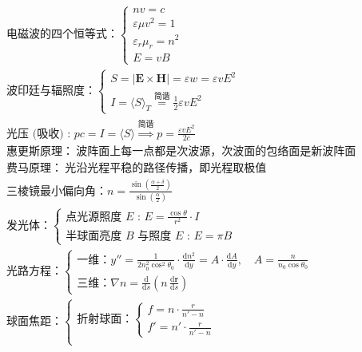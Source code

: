\documentclass[UTF8]{report}
\theoremstyle{MyLineTheoremStyle} %
\theoremstyle{MyBlockTheoremStyle} %
\theoremstyle{MySubsubsectionStyle} %
\begin{document}
\begin{align}
&
\text{电磁波的四个恒等式：} \begin{cases}
    nv = c \\ 
    \varepsilon \mu v^2 = 1 \\ 
    \varepsilon_r \mu_r = n^2 \\ 
    E = vB
\end{cases} 
\\ &
\text{波印廷与辐照度：} \begin{cases}
    S = | \boldsymbol{E}\times \boldsymbol{H} | = \varepsilon w = \varepsilon v E^2 \\ 
    I = \langle  S  \rangle_T \overset{\text{简谐}}{=} \frac{1}{2}\varepsilon v E^2 
\end{cases}
\\ &
\text{光压 (吸收) : \ } pc = I = \langle S \rangle \overset{\text{简谐}}{\Longrightarrow} p = \frac{\varepsilon v E^2}{2c}
\\ &
\text{惠更斯原理：} \ \text{波阵面上每一点都是次波源，次波面的包络面是新波阵面}
\\ &
\text{费马原理：} \ \text{光沿光程平稳的路径传播，即光程取极值}
\\ &
\text{三棱镜最小偏向角：} n = \frac{\sin \left(\frac{\alpha + \delta}{2}\right)}{\sin \left(\frac{\alpha}{2}\right)} 
\\ &
\text{发光体：}
\begin{cases}
    \text{点光源照度 $E$ :\ }E = \frac{\cos \theta}{r^2}\cdot I \\ 
    \text{半球面亮度 $B$ 与照度 $E$ :\ } E = \pi B
\end{cases} 
\\ &
\text{光路方程：}
\begin{cases}
    \text{一维：} y'' = \frac{1}{2n_0^2\cos^2 \theta_0}\cdot \frac{\mathrm{d} n^2 }{\mathrm{d} y } = A\cdot \frac{\mathrm{d} A }{\mathrm{d} y },\quad A = \frac{n}{n_0\cos \theta_0} \\ 
    \text{三维：} \nabla n = \frac{\mathrm{d}  }{\mathrm{d} s }\left(n\, \frac{\mathrm{d} \boldsymbol{r} }{\mathrm{d} s }\right)
\end{cases}
\\ &
\text{球面焦距：}
\begin{cases}
    \text{折射球面：}\begin{cases}
        f = n \cdot \frac{r}{n' - n} \\ 
        f' = n' \cdot \frac{r}{n' - n}
    \end{cases} \\ 

\end{cases}
\end{align}
\end{document}
